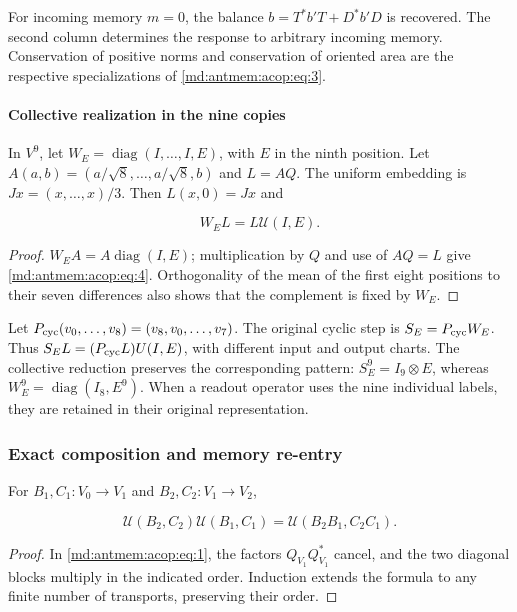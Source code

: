 For incoming memory \(m=0\), the balance \(b=T^*b'T+D^*b'D\) is recovered. The second column determines the response to arbitrary incoming memory. Conservation of positive norms and conservation of oriented area are the respective specializations of \eqref{md:antmem:acop:eq:3}.

\paragraph{Collective realization in the nine copies}

In \(V^9\), let \(W_E=\operatorname{diag}(I,\ldots,I,E)\), with \(E\) in the ninth position. Let \(A(a,b)=(a/\sqrt8,\ldots,a/\sqrt8,b)\) and \(L=AQ\). The uniform embedding is \(Jx=(x,\ldots,x)/3\). Then \(L(x,0)=Jx\) and

\begin{equation}
W_E L=L\mathcal U(I,E).
\label{md:antmem:acop:eq:4}
\end{equation}

\begin{proof}
\(W_EA=A\operatorname{diag}(I,E)\); multiplication by \(Q\) and use of \(AQ=L\) give \eqref{md:antmem:acop:eq:4}. Orthogonality of the mean of the first eight positions to their seven differences also shows that the complement is fixed by \(W_E\).
\end{proof}

Let \(P_{\rm cyc}(v_0,\ldots,v_8)=(v_8,v_0,\ldots,v_7)\). The original cyclic step is \(S_E=P_{\rm cyc}W_E\). Thus \(S_EL=(P_{\rm cyc}L)U(I,E)\), with different input and output charts. The collective reduction preserves the corresponding pattern: \(S_E^9=I_9\otimes E\), whereas \(W_E^9=\operatorname{diag}(I_8,E^9)\). When a readout operator uses the nine individual labels, they are retained in their original representation.

\subsubsection{Exact composition and memory re-entry}

For \(B_1,C_1:V_0\to V_1\) and \(B_2,C_2:V_1\to V_2\),

\begin{equation}
\boxed{\mathcal U(B_2,C_2)\mathcal U(B_1,C_1)
=\mathcal U(B_2B_1,C_2C_1).}
\label{md:antmem:acop:eq:5}
\end{equation}

\begin{proof}
In \eqref{md:antmem:acop:eq:1}, the factors \(Q_{V_1}Q_{V_1}^*\) cancel, and the two diagonal blocks multiply in the indicated order. Induction extends the formula to any finite number of transports, preserving their order.
\end{proof}


